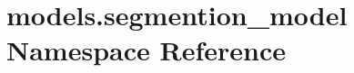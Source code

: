 \hypertarget{namespacemodels_1_1segmention__model}{}\section{models.\+segmention\+\_\+model Namespace Reference}
\label{namespacemodels_1_1segmention__model}
